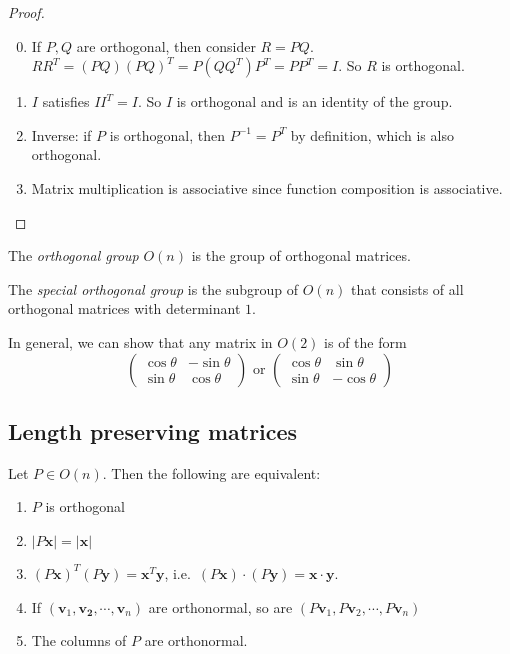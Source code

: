 \documentclass[a4paper]{article}
\begin{document}
\begin{proof}\leavevmode
  \begin{enumerate}[label=\arabic{*}.]
      \setcounter{enumi}{-1}
    \item If $P, Q$ are orthogonal, then consider $R = PQ$. $RR^T = (PQ)(PQ)^T = P(QQ^T)P^T = PP^T = I$. So $R$ is orthogonal.
    \item $I$ satisfies $II^T = I$. So $I$ is orthogonal and is an identity of the group.
    \item Inverse: if $P$ is orthogonal, then $P^{-1}=P^T$ by definition, which is also orthogonal.
    \item Matrix multiplication is associative since function composition is associative.\qedhere
  \end{enumerate}
\end{proof}

\begin{defi}
  The \emph{orthogonal group} $O(n)$ is the group of orthogonal matrices.
\end{defi}

\begin{defi}
  The \emph{special orthogonal group} is the subgroup of $O(n)$ that consists of all orthogonal matrices with determinant $1$.
\end{defi}

In general, we can show that any matrix in $O(2)$ is of the form
\[
  \begin{pmatrix}
    \cos\theta & -\sin\theta\\
    \sin\theta & \cos\theta
  \end{pmatrix}\text{ or }
  \begin{pmatrix}
    \cos\theta & \sin\theta\\
    \sin\theta & -\cos\theta
  \end{pmatrix}
\]
\subsection{Length preserving matrices}
\begin{thm}
  Let $P\in O(n)$. Then the following are equivalent:
  \begin{enumerate}
    \item $P$ is orthogonal
    \item $|P\mathbf{x}| = |\mathbf{x}|$
    \item $(P\mathbf{x})^T(P\mathbf{y}) = \mathbf{x}^T\mathbf{y}$, i.e.\ $(P\mathbf{x})\cdot(P\mathbf{y}) = \mathbf{x}\cdot \mathbf{y}$.
    \item If $(\mathbf{v}_1, \mathbf{v_2}, \cdots, \mathbf{v}_n)$ are orthonormal, so are $(P\mathbf{v}_1, P\mathbf{v}_2, \cdots, P\mathbf{v}_n)$
    \item The columns of $P$ are orthonormal.
  \end{enumerate}
\end{thm}
\end{document}
